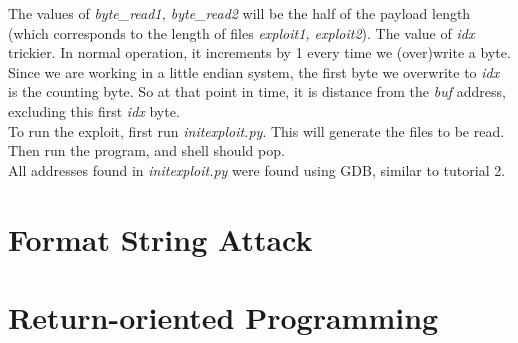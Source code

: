 \documentclass[12pt]{article}
\begin{document}
The values of \emph{byte\_read1, byte\_read2} will be the half of the payload length (which corresponds to the length of files \emph{exploit1, exploit2}). The value of \emph{idx} trickier. In normal operation, it increments by 1 every time we (over)write a byte. Since we are working in a little endian system, the first byte we overwrite to \emph{idx} is the counting byte. So at that point in time, it is distance from the \emph{buf} address, excluding this first \emph{idx} byte.\\

To run the exploit, first run \emph{initexploit.py}. This will generate the files to be read. Then run the program, and shell should pop.\\

All addresses found in \emph{initexploit.py} were found using GDB, similar to tutorial 2.


\newpage
\section{Format String Attack}






\newpage
\section{Return-oriented Programming}
\end{document}
